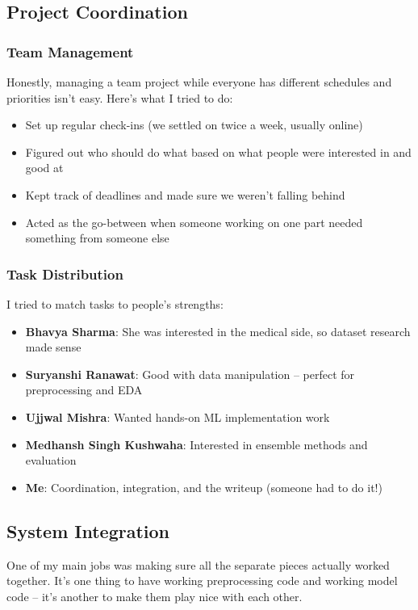 \documentclass[12pt]{article}
\begin{document}
\subsection{Project Coordination}

\subsubsection{Team Management}
Honestly, managing a team project while everyone has different schedules and priorities isn't easy. Here's what I tried to do:
\begin{itemize}
    \item Set up regular check-ins (we settled on twice a week, usually online)
    \item Figured out who should do what based on what people were interested in and good at
    \item Kept track of deadlines and made sure we weren't falling behind
    \item Acted as the go-between when someone working on one part needed something from someone else
\end{itemize}

\subsubsection{Task Distribution}
I tried to match tasks to people's strengths:
\begin{itemize}
    \item \textbf{Bhavya Sharma}: She was interested in the medical side, so dataset research made sense
    \item \textbf{Suryanshi Ranawat}: Good with data manipulation -- perfect for preprocessing and EDA
    \item \textbf{Ujjwal Mishra}: Wanted hands-on ML implementation work
    \item \textbf{Medhansh Singh Kushwaha}: Interested in ensemble methods and evaluation
    \item \textbf{Me}: Coordination, integration, and the writeup (someone had to do it!)
\end{itemize}

\subsection{System Integration}

One of my main jobs was making sure all the separate pieces actually worked together. It's one thing to have working preprocessing code and working model code -- it's another to make them play nice with each other.
\end{document}
